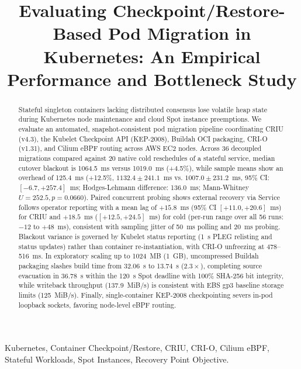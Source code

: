 \documentclass[conference,10pt]{IEEEtran}
\begin{document}
\title{Evaluating Checkpoint/Restore-Based Pod Migration in Kubernetes: An Empirical Performance and Bottleneck Study}

\author{
}

\maketitle

\begin{abstract}
Stateful singleton containers lacking distributed consensus lose volatile heap state during Kubernetes node maintenance and cloud Spot instance preemptions. We evaluate an automated, snapshot-consistent pod migration pipeline coordinating CRIU (v4.3), the Kubelet Checkpoint API (KEP-2008), Buildah OCI packaging, CRI-O (v1.31), and Cilium eBPF routing across AWS EC2 nodes. Across 36 decoupled migrations compared against 20 native cold reschedules of a stateful service, median cutover blackout is 1064.5~ms versus 1019.0~ms (+4.5\%), while sample means show an overhead of 125.4~ms (+12.5\%, $1132.4 \pm 241.1$~ms vs. $1007.0 \pm 231.2$~ms, 95\% CI: $[-6.7, +257.4]$~ms; Hodges-Lehmann difference: 136.0~ms; Mann-Whitney $U = 252.5, p = 0.0660$). Paired concurrent probing shows external recovery via Service follows operator reporting with a mean lag of $+15.8$~ms (95\% CI $[+11.0, +20.6]$~ms) for CRIU and $+18.5$~ms ($[+12.5, +24.5]$~ms) for cold (per-run range over all 56 runs: $-12$ to $+48$~ms), consistent with sampling jitter of 50~ms polling and 20~ms probing. Blackout variance is governed by Kubelet status reporting (1~s PLEG relisting and status updates) rather than container re-instantiation, with CRI-O unfreezing at 478--516~ms. In exploratory scaling up to 1024~MB (1~GB), uncompressed Buildah packaging slashes build time from 32.06~s to 13.74~s ($2.3\times$), completing source evacuation in 36.78~s within the 120~s Spot deadline with 100\% SHA-256 bit integrity, while writeback throughput (137.9~MiB/s) is consistent with EBS gp3 baseline storage limits (125~MiB/s). Finally, single-container KEP-2008 checkpointing severs in-pod loopback sockets, favoring node-level eBPF routing.
\end{abstract}

\begin{IEEEkeywords}
Kubernetes, Container Checkpoint/Restore, CRIU, CRI-O, Cilium eBPF, Stateful Workloads, Spot Instances, Recovery Point Objective.
\end{IEEEkeywords}
\end{document}
